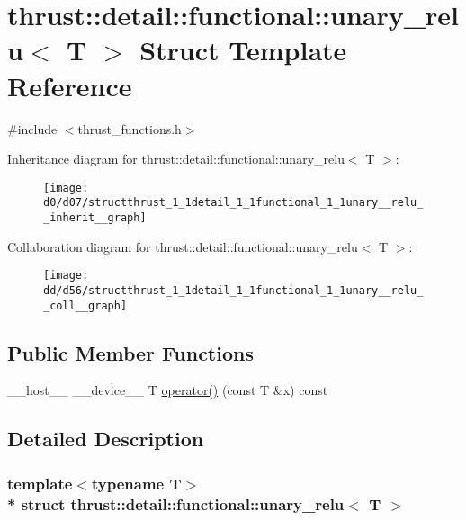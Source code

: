 \hypertarget{structthrust_1_1detail_1_1functional_1_1unary__relu}{}\section{thrust\+:\+:detail\+:\+:functional\+:\+:unary\+\_\+relu$<$ T $>$ Struct Template Reference}
\label{structthrust_1_1detail_1_1functional_1_1unary__relu}


{\ttfamily \#include $<$thrust\+\_\+functions.\+h$>$}



Inheritance diagram for thrust\+:\+:detail\+:\+:functional\+:\+:unary\+\_\+relu$<$ T $>$\+:
\nopagebreak
\begin{figure}[H]
\begin{center}
\leavevmode
\texttt{[image: d0/d07/structthrust\_1\_1detail\_1\_1functional\_1\_1unary\_\_relu\_\_inherit\_\_graph]}
\end{center}
\end{figure}


Collaboration diagram for thrust\+:\+:detail\+:\+:functional\+:\+:unary\+\_\+relu$<$ T $>$\+:
\nopagebreak
\begin{figure}[H]
\begin{center}
\leavevmode
\texttt{[image: dd/d56/structthrust\_1\_1detail\_1\_1functional\_1\_1unary\_\_relu\_\_coll\_\_graph]}
\end{center}
\end{figure}
\subsection*{Public Member Functions}
\begin{DoxyCompactItemize}
\item 
\+\_\+\+\_\+host\+\_\+\+\_\+ \+\_\+\+\_\+device\+\_\+\+\_\+ T \hyperlink{structthrust_1_1detail_1_1functional_1_1unary__relu_ac740060f5bd91475760625d5702dac67}{operator()} (const T \&x) const 
\end{DoxyCompactItemize}


\subsection{Detailed Description}
\subsubsection*{template$<$typename T$>$\\*
struct thrust\+::detail\+::functional\+::unary\+\_\+relu$<$ T $>$}



